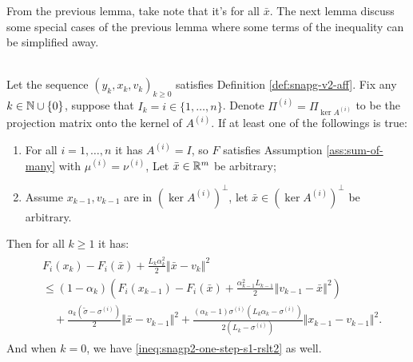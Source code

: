 \documentclass[12pt]{article}
\begin{document}
    From the previous lemma, take note that it's for all $\bar x$. 
    The next lemma discuss some special cases of the previous lemma where some terms of the inequality can be simplified away. 
    \begin{lemma}\;\label{snapg2-one-step-s2-proto}\\
        Let the sequence $(y_k, x_k, v_k)_{k \ge 0}$ satisfies Definition \ref{def:snapg-v2-aff}. 
        Fix any $k \in \mathbb N \cup\{0\}$, suppose that $I_k = i \in \{1, \ldots, n\}$.
        Denote $\Pi^{(i)} = \Pi_{\ker A^{(i)}}$ to be the projection matrix onto the kernel of $A^{(i)}$. 
        If at least one of the followings is true: 
        \begin{enumerate}[nosep]
            \item For all $i = 1, \ldots, n$ it has $A^{(i)} = I$, so $F$ satisfies Assumption \ref{ass:sum-of-many} with $\mu^{(i)} = \nu^{(i)}$, Let $\bar x \in \mathbb R^m$ be arbitrary;
            \item Assume $x_{k - 1}, v_{k - 1}$ are in $\left(\ker A^{(i)}\right)^\perp$, let $\bar x \in \left(\ker A^{(i)}\right)^{\perp}$ be arbitrary. 
        \end{enumerate}
        Then for all $k \ge 1$ it has: 
        \begin{align}\begin{split}
            &F_i(x_{k}) - F_i(\bar x) 
            + \frac{L_k\alpha_k^2}{2} \left\Vert \bar x - v_k\right\Vert^2
            \\
            &\le 
            (1 - \alpha_k)\left(
                F_i(x_{k - 1}) - F_i(\bar x) + \frac{\alpha_{k - 1}^2L_{k - 1}}{2}
                \left\Vert v_{k - 1} - \bar x\right\Vert^2
            \right)     
                \\ &\quad 
                + \frac{\alpha_k(\tilde\sigma - \sigma^{(i)})}{2}\Vert \bar x - v_{k - 1}\Vert^2
                + \frac{(\alpha_k - 1)\sigma^{(i)}\left(L_k\alpha_k - \sigma^{(i)}\right)}{2\left(L_k - \sigma^{(i)}\right)}\Vert x_{k - 1} - v_{k - 1} \Vert^2.
        \end{split}\end{align}
        And when $k = 0$, we have \eqref{ineq:snagp2-one-step-s1-rslt2} as well. 
    \end{lemma}
\end{document}
